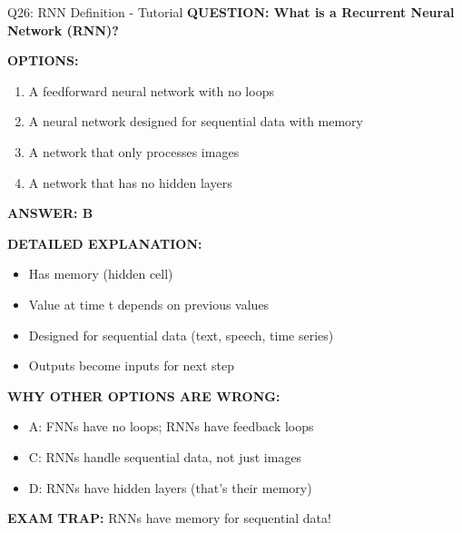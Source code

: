\documentclass[8pt]{beamer}
\begin{document}
	\begin{frame}{Q26: RNN Definition - Tutorial}
		\fontsize{6.5}{7.5}\selectfont
		\textbf{QUESTION: What is a Recurrent Neural Network (RNN)?}
		
		\vspace{0.1cm}
		\textbf{OPTIONS:}
		\begin{enumerate}
			\item A feedforward neural network with no loops
			\item A neural network designed for sequential data with memory
			\item A network that only processes images
			\item A network that has no hidden layers
		\end{enumerate}
		
		\vspace{0.1cm}
		\textcolor{myblue}{\textbf{ANSWER: B}}
		
		\vspace{0.1cm}
		\textbf{DETAILED EXPLANATION:}
		\begin{itemize}
			\item Has memory (hidden cell)
			\item Value at time t depends on previous values
			\item Designed for sequential data (text, speech, time series)
			\item Outputs become inputs for next step
		\end{itemize}
		
		\vspace{0.1cm}
		\textcolor{myred}{\textbf{WHY OTHER OPTIONS ARE WRONG:}}
		\begin{itemize}
			\item \textcolor{myred}{A:} FNNs have no loops; RNNs have feedback loops
			\item \textcolor{myred}{C:} RNNs handle sequential data, not just images
			\item \textcolor{myred}{D:} RNNs have hidden layers (that's their memory)
		\end{itemize}
		
		\textcolor{myred}{\textbf{EXAM TRAP:}} RNNs have \textcolor{myblue}{memory} for sequential data!
	\end{frame}
	
\end{document}

